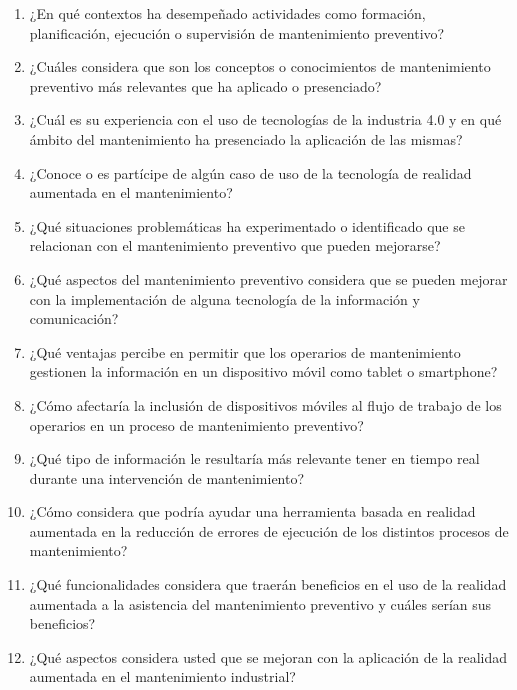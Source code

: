 \begin{enumerate}[leftmargin=*]
    \item ¿En qué contextos ha desempeñado actividades como formación, planificación, ejecución o supervisión de mantenimiento preventivo?

    \item ¿Cuáles considera que son los conceptos o conocimientos de mantenimiento preventivo más relevantes que ha aplicado o presenciado?

    \item ¿Cuál es su experiencia con el uso de tecnologías de la industria 4.0 y en qué ámbito del mantenimiento ha presenciado la aplicación de las mismas?

    \item ¿Conoce o es partícipe de algún caso de uso de la tecnología de realidad aumentada en el mantenimiento?

    \item ¿Qué situaciones problemáticas ha experimentado o identificado que se relacionan con el mantenimiento preventivo que pueden mejorarse?

    \item ¿Qué aspectos del mantenimiento preventivo considera que se pueden mejorar con la implementación de alguna tecnología de la información y comunicación?

    \item ¿Qué ventajas percibe en permitir que los operarios de mantenimiento gestionen la información en un dispositivo móvil como tablet o smartphone?

    \item ¿Cómo afectaría la inclusión de dispositivos móviles al flujo de trabajo de los operarios en un proceso de mantenimiento preventivo?

    \item ¿Qué tipo de información le resultaría más relevante tener en tiempo real durante una intervención de mantenimiento?

    \item ¿Cómo considera que podría ayudar una herramienta basada en realidad aumentada en la reducción de errores de ejecución de los distintos procesos de mantenimiento?

    \item ¿Qué funcionalidades considera que traerán beneficios en el uso de la realidad aumentada a la asistencia del mantenimiento preventivo y cuáles serían sus beneficios?

    \item ¿Qué aspectos considera usted que se mejoran con la aplicación de la realidad aumentada en el mantenimiento industrial?


\end{enumerate}
